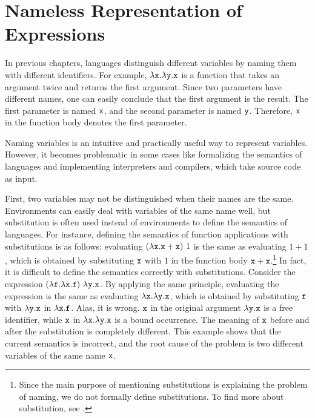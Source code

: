 \chapter{Nameless Representation of Expressions}

\renewcommand{\Lang}{\textsf{FAE}\xspace}

In previous chapters, languages distinguish different variables by naming them
with different identifiers. For
example, $\lambda \texttt{x}.\lambda \texttt{y}.\texttt{x}$ is a function that takes an
argument twice and returns the first argument. Since two parameters have different
names, one can easily conclude that the first argument is the result. The first
parameter is named $\texttt{x}$, and the second parameter is named $\texttt{y}$. Therefore,
$\texttt{x}$ in the function body denotes the first parameter.

Naming variables is an intuitive and practically useful way to represent
variables. However, it becomes problematic in some cases like formalizing the
semantics of languages and implementing interpreters and compilers, which take
source code as input.

First, two variables may not be distinguished when their names are the same.
Environments can easily deal with variables of the same name well, but
substitution is often used instead of environments to define the semantics of
languages. For instance, defining the semantics of function applications with
substitutions is as follows: evaluating $(\lambda \texttt{x}.\texttt{x} + \texttt{x})\ 1$
is the same as evaluating $1+1$, which is obtained by substituting $\texttt{x}$ with
$1$ in the function body $\texttt{x}+\texttt{x}$.\footnote{Since the main purpose of mentioning
substitutions is explaining the problem of naming, we do not formally
define substitutions. To find more about substitution, see .}
In fact, it is difficult to define the semantics correctly
with substitutions. Consider the expression $(\lambda \texttt{f}.\lambda \texttt{x}.\texttt{f})\ \lambda \texttt{y}.\texttt{x}$.
By applying the same principle, evaluating
the expression is the same as evaluating $\lambda \texttt{x}.\lambda \texttt{y}.\texttt{x}$,
which is obtained by substituting $\texttt{f}$ with $\lambda \texttt{y}.\texttt{x}$ in
$\lambda \texttt{x}.\texttt{f}$. Alas, it is wrong. $\texttt{x}$ in the original argument
$\lambda \texttt{y}.\texttt{x}$ is a free identifier, while $\texttt{x}$ in $\lambda \texttt{x}.\lambda \texttt{y}.\texttt{x}$
is a bound occurrence. The meaning of $\texttt{x}$
before and after the substitution is completely different. This example shows
that the current semantics is incorrect, and the root cause of the problem is
two different variables of the same name $\texttt{x}$.


